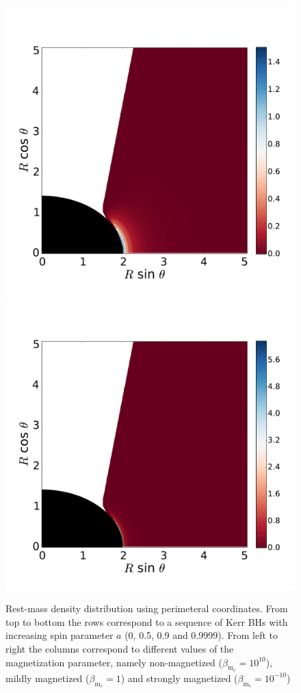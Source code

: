 \documentclass[twocolumn,aps,showpacs,showkeys,prd,superscriptaddress,byrevtex, amsmath]{revtex4-1}
\begin{document}
\begin{figure}
\hspace{-0.3cm}
\includegraphics[scale=0.14]{figures/fig10_09999_1.pdf}
\hspace{-0.2cm}
\includegraphics[scale=0.14]{figures/fig10_09999__10.pdf}
\hspace{-0.2cm}
\caption{Rest-mass density distribution using perimeteral coordinates. From top to bottom the rows correspond to a sequence of Kerr BHs with increasing spin parameter $a$ (0, 0.5, 0.9 and 0.9999). From left to right the columns correspond to different values of the magnetization parameter, namely non-magnetized ($\beta_{\mathrm{m}_{\mathrm{c}}} = 10^{10}$), mildly magnetized ($\beta_{\mathrm{m}_{\mathrm{c}}} = 1$) and strongly magnetized ($\beta_{\mathrm{m}_{\mathrm{c}}} = 10^{-10}$)}
\label{models_Kerr_peri}
\end{figure}
\end{document}
